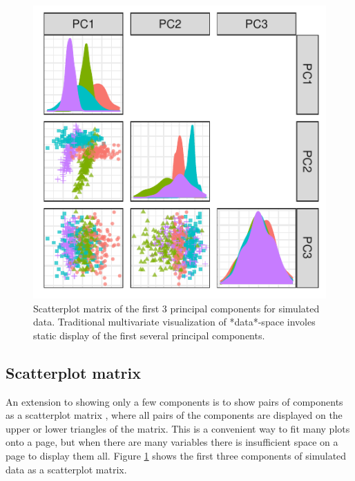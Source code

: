 \documentclass{template/monashthesis}
\begin{document}
\begin{figure}

{\centering \includegraphics[width=1\linewidth,]{./figures_from_script/ch4_fig1_pca_splom} 

}

\caption{Scatterplot matrix of the first 3 principal components for simulated data. Traditional multivariate visualization of *data*-space involes static display of the first several principal components.}\label{fig:ch4fig1}
\end{figure}

\hypertarget{scatterplot-matrix}{%
\subsection{Scatterplot matrix}\label{scatterplot-matrix}}

An extension to showing only a few components is to show pairs of components as a scatterplot matrix \autocite{chambers_graphical_1983}, where all pairs of the components are displayed on the upper or lower triangles of the matrix. This is a convenient way to fit many plots onto a page, but when there are many variables there is insufficient space on a page to display them all. Figure \ref{fig:ch4fig1} shows the first three components of simulated data as a scatterplot matrix.
\end{document}
